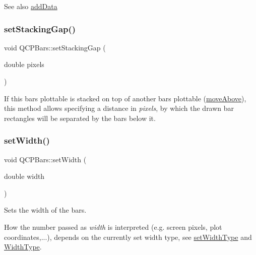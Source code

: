 \begin{DoxySeeAlso}{See also}
\hyperlink{classQCPBars_a323d6970d6d6e3166d89916a7f60f733}{add\+Data} 
\end{DoxySeeAlso}
\mbox{\label{classQCPBars_aeacf7561afb1c70284b22822b57c7bb5}} 
\subsubsection{\texorpdfstring{set\+Stacking\+Gap()}{setStackingGap()}}
{\footnotesize\ttfamily void Q\+C\+P\+Bars\+::set\+Stacking\+Gap (\begin{DoxyParamCaption}\item[{double}]{pixels }\end{DoxyParamCaption})}

If this bars plottable is stacked on top of another bars plottable (\hyperlink{classQCPBars_ac22e00a6a41509538c21b04f0a57318c}{move\+Above}), this method allows specifying a distance in {\itshape pixels}, by which the drawn bar rectangles will be separated by the bars below it. \mbox{\label{classQCPBars_afec6116579d44d5b706e0fa5e5332507}} 
\subsubsection{\texorpdfstring{set\+Width()}{setWidth()}}
{\footnotesize\ttfamily void Q\+C\+P\+Bars\+::set\+Width (\begin{DoxyParamCaption}\item[{double}]{width }\end{DoxyParamCaption})}

Sets the width of the bars.

How the number passed as {\itshape width} is interpreted (e.\+g. screen pixels, plot coordinates,...), depends on the currently set width type, see \hyperlink{classQCPBars_adcaa3b41281bb2c0f7949b341592fcc0}{set\+Width\+Type} and \hyperlink{classQCPBars_a65dbbf1ab41cbe993d71521096ed4649}{Width\+Type}. \mbox{\label{classQCPBars_adcaa3b41281bb2c0f7949b341592fcc0}} 
